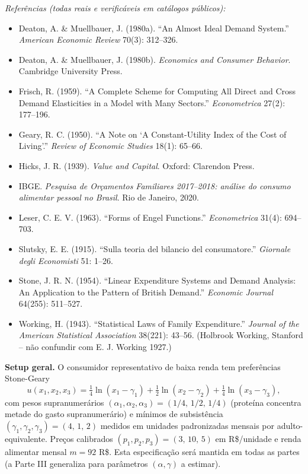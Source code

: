 \documentclass[11pt,addpoints]{exam}
\begin{document}
\begin{contextbox}
\medskip
\textit{Referências (todas reais e verificáveis em catálogos públicos):}
\begin{itemize}[noitemsep,topsep=0pt]
\item Deaton, A. \& Muellbauer, J. (1980a). ``An Almost Ideal Demand System.'' \textit{American Economic Review} 70(3): 312--326.
\item Deaton, A. \& Muellbauer, J. (1980b). \textit{Economics and Consumer Behavior}. Cambridge University Press.
\item Frisch, R. (1959). ``A Complete Scheme for Computing All Direct and Cross Demand Elasticities in a Model with Many Sectors.'' \textit{Econometrica} 27(2): 177--196.
\item Geary, R. C. (1950). ``A Note on `A Constant-Utility Index of the Cost of Living'.'' \textit{Review of Economic Studies} 18(1): 65--66.
\item Hicks, J. R. (1939). \textit{Value and Capital}. Oxford: Clarendon Press.
\item IBGE. \textit{Pesquisa de Orçamentos Familiares 2017--2018: análise do consumo alimentar pessoal no Brasil}. Rio de Janeiro, 2020.
\item Leser, C. E. V. (1963). ``Forms of Engel Functions.'' \textit{Econometrica} 31(4): 694--703.
\item Slutsky, E. E. (1915). ``Sulla teoria del bilancio del consumatore.'' \textit{Giornale degli Economisti} 51: 1--26.
\item Stone, J. R. N. (1954). ``Linear Expenditure Systems and Demand Analysis: An Application to the Pattern of British Demand.'' \textit{Economic Journal} 64(255): 511--527.
\item Working, H. (1943). ``Statistical Laws of Family Expenditure.'' \textit{Journal of the American Statistical Association} 38(221): 43--56. (Holbrook Working, Stanford -- não confundir com E. J. Working 1927.)
\end{itemize}
\end{contextbox}

\vspace{0.5em}

\noindent\textbf{Setup geral.} O consumidor representativo de baixa renda tem preferências Stone-Geary
\[
   u(x_1, x_2, x_3) = \tfrac{1}{4} \ln(x_1 - \gamma_1) + \tfrac{1}{2}\ln(x_2 - \gamma_2) + \tfrac{1}{4}\ln(x_3 - \gamma_3),
\]
com pesos supranumerários $(\alpha_1, \alpha_2, \alpha_3) = (1/4,\, 1/2,\, 1/4)$ (proteína concentra metade do gasto supranumerário) e mínimos de subsistência $(\gamma_1, \gamma_2, \gamma_3) = (4,\, 1,\, 2)$ medidos em unidades padronizadas mensais por adulto-equivalente. Preços calibrados $(p_1, p_2, p_3) = (3,\, 10,\, 5)$ em R\$/unidade e renda alimentar mensal $m = 92$ R\$. Esta especificação será mantida em todas as partes (a Parte III generaliza para parâmetros $(\alpha, \gamma)$ a estimar).
\end{document}
